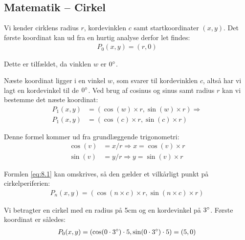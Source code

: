 \subsection{Matematik -- Cirkel}
Vi kender cirklens radius $r$, kordevinklen $c$ samt startkoordinater $(x, y)$. Det første koordinat kan ud fra en hurtig analyse derfor let findes:
\begin{align*}
P_0(x, y)=(r, 0)
\end{align*}

Dette er tilfældet, da vinklen $w$ er $0^\circ$.

Næste koordinat ligger i en vinkel $w$, som svarer til kordevinklen $c$, altså har vi lagt en kordevinkel til de $0^\circ$. Ved brug af cosinus og sinus samt radius $r$ kan vi bestemme det næste koordinat:
\begin{align}
P_1(x, y)&=(\cos(w)\times r, \sin(w)\times r) \Rightarrow \nonumber \\
P_1(x, y)&=(\cos(c)\times r, \sin(c)\times r) \label{eq:8.1}
\end{align}
 
Denne formel kommer ud fra grundlæggende trigonometri:
\begin{align*}
\cos(v) &= x/r \Rightarrow x = \cos(v)\times r \\
\sin(v) &= y/r \Rightarrow y = \sin(v)\times r
\end{align*}
 
Formlen \vref{eq:8.1} kan omskrives, så den gælder et vilkårligt punkt på cirkelperiferien:
\begin{align}
P_n(x, y)=(\cos(n\times c)\times r, \sin(n\times c)\times r)
\end{align}

Vi betragter en cirkel med en radius på 5cm og en kordevinkel på $3^\circ$. Første koordinat er således:
\begin{align*}
P_0(x, y)&=(\cos(0\cdot 3^\circ)\cdot 5 , \sin(0\cdot 3^\circ)\cdot 5)=(5, 0) \\
\end{align*}

